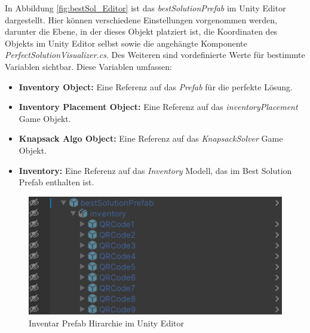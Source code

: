 In Abbildung \ref{fig:bestSol_Editor} ist das \textit{bestSolutionPrefab} im Unity Editor dargestellt. Hier können
verschiedene Einstellungen vorgenommen werden, darunter die Ebene, in der dieses Objekt platziert ist, die Koordinaten
des Objekts im Unity Editor selbst sowie die angehängte Komponente \textit{PerfectSolutionVisualizer.cs}. Des Weiteren
sind vordefinierte Werte für bestimmte Variablen sichtbar. Diese Variablen umfassen:
\begin{itemize}
    \item \textbf{Inventory Object:} Eine Referenz auf das \textit{Prefab} für die perfekte Lösung.
    \item \textbf{Inventory Placement Object:} Eine Referenz auf das \textit{inventoryPlacement} Game Objekt.
    \item \textbf{Knapsack Algo Object:} Eine Referenz auf das \textit{KnapsackSolver} Game Objekt.
    \item \textbf{Inventory:} Eine Referenz auf das \textit{Inventory} Modell, das im Best Solution Prefab enthalten ist.
\end{itemize}

\begin{figure}[H]
    \centering
    \includegraphics[scale=0.8]{images/bestSolPref}
    \caption{Inventar Prefab Hirarchie im Unity Editor}
    \label{fig:InvPref}
\end{figure}

